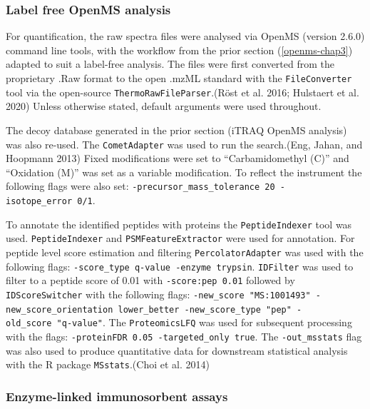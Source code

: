 \documentclass[9pt,lineno]{elife}
\begin{document}
\hypertarget{openms-label-free}{%
\subsubsection{Label free OpenMS analysis}\label{openms-label-free}}

For quantification, the raw spectra files were analysed via OpenMS (version 2.6.0) command line tools, with the workflow from the prior section (\ref{openms-chap3}) adapted to suit a label-free analysis.
The files were first converted from the proprietary .Raw format to the open .mzML standard with the \texttt{FileConverter} tool via the open-source \texttt{ThermoRawFileParser}.(Röst et al. 2016; Hulstaert et al. 2020)
Unless otherwise stated, default arguments were used throughout.

The decoy database generated in the prior section (iTRAQ OpenMS analysis) was also re-used.
The \texttt{CometAdapter} was used to run the search.(Eng, Jahan, and Hoopmann 2013)
Fixed modifications were set to ``Carbamidomethyl (C)'' and ``Oxidation (M)'' was set as a variable modification.
To reflect the instrument the following flags were also set: \texttt{-precursor\_mass\_tolerance\ 20\ -isotope\_error\ 0/1}.

To annotate the identified peptides with proteins the \texttt{PeptideIndexer} tool was used.
\texttt{PeptideIndexer} and \texttt{PSMFeatureExtractor} were used for annotation.
For peptide level score estimation and filtering \texttt{PercolatorAdapter} was used with the following flags: \texttt{-score\_type\ q-value\ -enzyme\ trypsin}.
\texttt{IDFilter} was used to filter to a peptide score of 0.01 with \texttt{-score:pep\ 0.01} followed by \texttt{IDScoreSwitcher} with the following flags: \texttt{-new\_score\ "MS:1001493"\ -new\_score\_orientation\ lower\_better\ -new\_score\_type\ "pep"\ -old\_score\ "q-value"}.
The \texttt{ProteomicsLFQ} was used for subsequent processing with the flags: \texttt{-proteinFDR\ 0.05\ -targeted\_only\ true}.
The \texttt{-out\_msstats} flag was also used to produce quantitative data for downstream statistical analysis with the R package \texttt{MSstats}.(Choi et al. 2014)

\clearpage

\hypertarget{enzyme-linked-immunosorbent-assays}{%
\subsubsection{Enzyme-linked immunosorbent assays}\label{enzyme-linked-immunosorbent-assays}}
\end{document}
